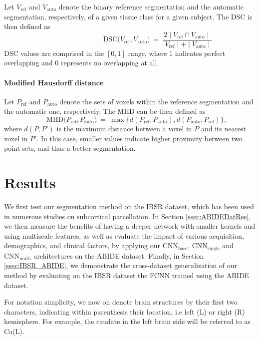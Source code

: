 \documentclass[twoside,fleqn,espcrc2]{elsarticle}
\newcommand{\CNNbase}{\mr{CNN}_\mr{base}}
\newcommand{\CNNsingle}{\mr{CNN}_\mr{single}}
\newcommand{\CNNmulti}{\mr{CNN}_\mr{multi}}
\newcommand{\mr}[1]{\mathrm{#1}}
\begin{document}
Let $V_\mr{ref}$ and $V_\mr{auto}$ denote the binary reference segmentation and the automatic segmentation, respectively, of a given tissue class for a given subject. The DSC is then defined as
\begin{equation}
	\qquad \qquad \qquad \qquad
	    \mr{DSC}\big(V_\mr{ref}, V_\mr{auto} \big) \ = \ \frac{2 \mid V_\mr{ref} \cap V_\mr{auto}\mid} {\mid V_\mr{ref}\mid +\mid V_\mr{auto}\mid}
\end{equation}
DSC values are comprised in the $[0,1]$ range, where 1 indicates perfect overlapping and 0 represents no overlapping at all.

\paragraph{\textbf{Modified Hausdorff distance}}

Let $P_\mr{ref}$ and $P_\mr{auto}$ denote the sets of voxels within the reference segmentation and the automatic one, respectively. The MHD can be then defined as
\begin{equation}
	\qquad  \mr{MHD}\big(P_\mr{ref}, P_\mr{auto} \big) \ = \
	    \max \Big\{ d(P_\mr{ref},P_\mr{auto}), d(P_\mr{auto},P_\mr{ref}) \Big\},
\end{equation}
where $d(P,P')$ is the maximum distance between a voxel in $P$ and its nearest voxel in $P'$. In this case, smaller values indicate higher proximity between two point sets, and thus a better segmentation.

\section{Results}
\label{ssec:results}

We first test our segmentation method on the IBSR dataset, which has been used in numerous studies on subcortical parcellation. In Section \ref{ssec:ABIDEDatRes}, we then measure the benefits of having a deeper network with smaller kernels and using multiscale features, as well as evaluate the impact of various acquisition, demographics, and clinical factors, by applying our $\CNNbase$, $\CNNsingle$ and $\CNNmulti$ architectures on the ABIDE dataset. Finally, in Section \ref{ssec:IBSR_ABIDE}, we demonstrate the cross-dataset generalization  of our method by evaluating on the IBSR dataset the FCNN trained using the ABIDE dataset.

For notation simplicity, we now on denote brain structures by their first two characters, indicating within parenthesis their location, i.e left (L) or right (R) hemisphere. For example, the caudate in the left brain side will be referred to as Ca(L).
\end{document}
